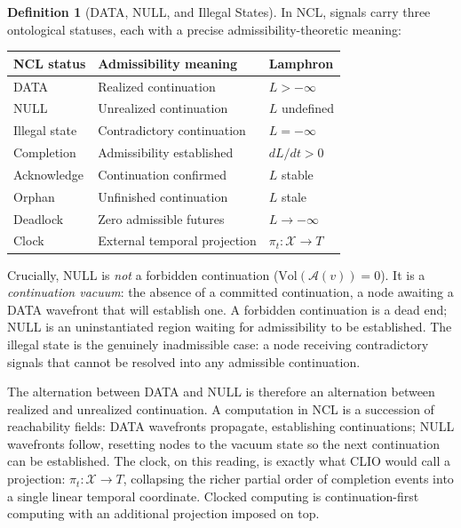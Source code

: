 \documentclass[12pt, oneside]{book}
\theoremstyle{flyxion}
\theoremstyle{definition}
\newtheorem{definition}[theorem]{Definition}
\begin{document}
\begin{definition}[DATA, NULL, and Illegal States]
In NCL, signals carry three ontological statuses,
each with a precise admissibility-theoretic meaning:

\medskip
\begin{center}
\renewcommand{\arraystretch}{1.4}
\begin{tabular}{lll}
\toprule
NCL status & Admissibility meaning & Lamphron \\
\midrule
DATA & Realized continuation & $L > -\infty$ \\
NULL & Unrealized continuation & $L$ undefined \\
Illegal state & Contradictory continuation &
  $L = -\infty$ \\
Completion & Admissibility established & $dL/dt > 0$ \\
Acknowledge & Continuation confirmed & $L$ stable \\
Orphan & Unfinished continuation & $L$ stale \\
Deadlock & Zero admissible futures & $L \to -\infty$ \\
Clock & External temporal projection &
  $\pi_t : \mathcal{X} \to T$ \\
\bottomrule
\end{tabular}
\end{center}
\medskip

Crucially, NULL is \emph{not} a forbidden continuation
($\mathrm{Vol}(\mathcal{A}(v)) = 0$). It is a
\emph{continuation vacuum}: the absence of a committed
continuation, a node awaiting a DATA wavefront that
will establish one. A forbidden continuation is a
dead end; NULL is an uninstantiated region waiting for
admissibility to be established. The illegal state is
the genuinely inadmissible case: a node receiving
contradictory signals that cannot be resolved into any
admissible continuation.
\end{definition}

The alternation between DATA and NULL is therefore an
alternation between realized and unrealized continuation.
A computation in NCL is a succession of reachability
fields: DATA wavefronts propagate, establishing
continuations; NULL wavefronts follow, resetting nodes
to the vacuum state so the next continuation can be
established. The clock, on this reading, is exactly
what CLIO would call a projection:
$\pi_t : \mathcal{X} \to T$, collapsing the richer
partial order of completion events into a single linear
temporal coordinate. Clocked computing is
continuation-first computing with an additional
projection imposed on top.
\end{document}
